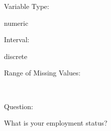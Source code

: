 \documentclass[
]{article}
\begin{document}
\begin{minipage}[t]{0.3\linewidth}

Variable Type:

\end{minipage}%
\begin{minipage}[t]{0.7\linewidth}

numeric

\end{minipage}

\begin{minipage}[t]{0.3\linewidth}

Interval:

\end{minipage}%
\begin{minipage}[t]{0.7\linewidth}

discrete

\end{minipage}

\begin{minipage}[t]{0.3\linewidth}

Range of Missing Values:

\end{minipage}%
\begin{minipage}[t]{0.7\linewidth}

~

\end{minipage}

\begin{minipage}[t]{0.3\linewidth}

Question:

\end{minipage}%
\begin{minipage}[t]{0.7\linewidth}

What is your employment status?

\end{minipage}
\end{document}
